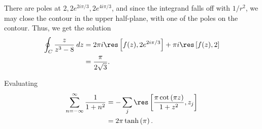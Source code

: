 \documentclass[10pt]{mypackage}
\begin{document}
\RaggedRight
\begin{solution}[21.20a]
  There are poles at $2,2e^{2i\pi/3},2e^{4i\pi/3}$, and since the integrand falls off with $1/r^2$, we may close the contour in the upper half-plane, with one of the poles on the contour. Thus, we get the solution
  \begin{align*}
    \oint_{C} \frac{z}{z^3 - 8}\:dz &= 2\pi i \res\left[ f(z),2e^{2i\pi/3} \right] + \pi i \res\left[ f(z),2 \right]\\
                                    &= \frac{\pi}{2\sqrt{3}}.
  \end{align*}
\end{solution}
\begin{solution}[21.25a]
  Evaluating
  \begin{align*}
    \sum_{n=-\infty}^{\infty}\frac{1}{1 + n^2} &= -\sum_{j} \res\left[ \frac{\pi\cot\left( \pi z \right)}{1 + z^2}, z_j \right]\\
                                               &= 2\pi\tanh\left(\pi\right).
  \end{align*}
\end{solution}
\begin{solution}[21.26]

\end{solution}
\begin{solution}[21.28]

\end{solution}
\begin{solution}[21.31]

\end{solution}
\begin{solution}[21.32]

\end{solution}
\begin{solution}[21.33]

\end{solution}
\begin{solution}[22.7]

\end{solution}
\end{document}
